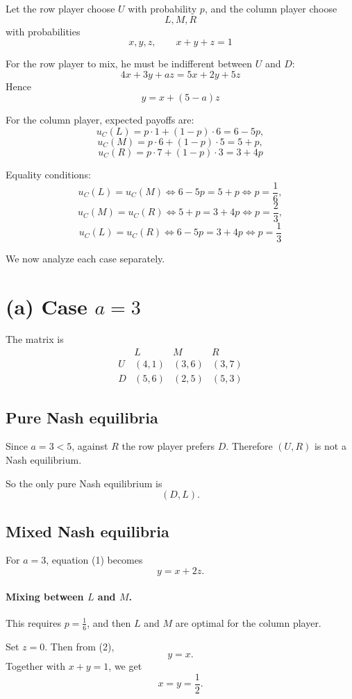 Let the row player choose \(U\) with probability \(p\), and the column player choose
\[
L,M,R
\]
with probabilities
\[
x,y,z,
\qquad x+y+z=1
\]

For the row player to mix, he must be indifferent between \(U\) and \(D\):
\[
4x+3y+az = 5x+2y+5z
\]
Hence
\[
y = x + (5-a)z \tag{1}
\]

For the column player, expected payoffs are:
\[
u_C(L)=p\cdot 1+(1-p)\cdot 6=6-5p,
\]
\[
u_C(M)=p\cdot 6+(1-p)\cdot 5=5+p,
\]
\[
u_C(R)=p\cdot 7+(1-p)\cdot 3=3+4p
\]

Equality conditions:
\[
u_C(L)=u_C(M) \iff 6-5p=5+p \iff p=\frac16,
\]
\[
u_C(M)=u_C(R) \iff 5+p=3+4p \iff p=\frac23,
\]
\[
u_C(L)=u_C(R) \iff 6-5p=3+4p \iff p=\frac13
\]

We now analyze each case separately.

\section*{(a) Case \(a=3\)}

The matrix is
\[
\begin{array}{c|ccc}
 & L & M & R\\
\hline
U & (4,1) & (3,6) & (3,7)\\
D & (5,6) & (2,5) & (5,3)
\end{array}
\]

\subsection*{Pure Nash equilibria}

Since \(a=3<5\), against \(R\) the row player prefers \(D\). Therefore \((U,R)\) is not a Nash equilibrium.

So the only pure Nash equilibrium is
\[
(D,L).
\]

\subsection*{Mixed Nash equilibria}

For \(a=3\), equation (1) becomes
\[
y=x+2z. \tag{2}
\]

\paragraph{Mixing between \(L\) and \(M\).}
This requires \(p=\frac16\), and then \(L\) and \(M\) are optimal for the column player.

Set \(z=0\). Then from (2),
\[
y=x.
\]
Together with \(x+y=1\), we get
\[
x=y=\frac12.
\]

